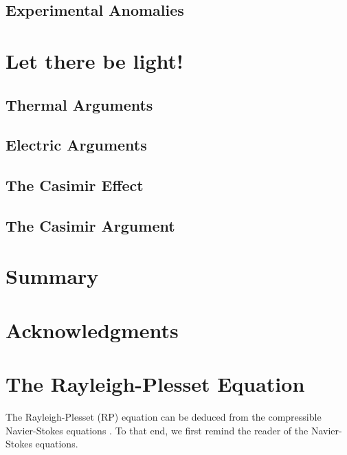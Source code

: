 \documentclass[rmp,aps,nofootinbib,superscriptaddress,floatfix]{revtex4-2}
\begin{document}
\subsection{Experimental Anomalies}


\section{Let there be light!}
\subsection{Thermal Arguments}
\subsection{Electric Arguments}

\subsection{The Casimir Effect}
\subsection{The Casimir Argument}


\section{Summary}

\section{Acknowledgments}

\appendix

\section{The Rayleigh-Plesset Equation}
The Rayleigh-Plesset (RP) equation can be deduced from the compressible Navier-Stokes equations \cite{}. To that end, we first remind the reader of the Navier-Stokes equations. 
\end{document}
